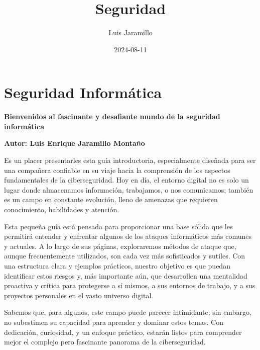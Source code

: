 \documentclass[
  letterpaper,
  DIV=11,
  numbers=noendperiod]{scrreprt}
\title{Seguridad}
\author{Luis Jaramillo}
\date{2024-08-11}
\renewcommand*\contentsname{Table of contents}
\newcommand\contentsname{Table of contents}
\begin{document}
\maketitle
\ifdefined\Shaded\renewenvironment{Shaded}{\begin{tcolorbox}[sharp corners, boxrule=0pt, enhanced, breakable, borderline west={3pt}{0pt}{shadecolor}, interior hidden, frame hidden]}{\end{tcolorbox}}\fi

\renewcommand*\contentsname{Table of contents}
{
\hypersetup{linkcolor=}
\setcounter{tocdepth}{2}
\tableofcontents
}

\hypertarget{seguridad-informuxe1tica}{%
\chapter{Seguridad Informática}\label{seguridad-informuxe1tica}}

\textbf{Bienvenidos al fascinante y desafiante mundo de la seguridad
informática}

\textbf{Autor: Luis Enrique Jaramillo Montaño}

Es un placer presentarles esta guía introductoria, especialmente
diseñada para ser una compañera confiable en su viaje hacia la
comprensión de los aspectos fundamentales de la ciberseguridad. Hoy en
día, el entorno digital no es solo un lugar donde almacenamos
información, trabajamos, o nos comunicamos; también es un campo en
constante evolución, lleno de amenazas que requieren conocimiento,
habilidades y atención.

Esta pequeña guía está pensada para proporcionar una base sólida que les
permitirá entender y enfrentar algunos de los ataques informáticos más
comunes y actuales. A lo largo de sus páginas, exploraremos métodos de
ataque que, aunque frecuentemente utilizados, son cada vez más
sofisticados y sutiles. Con una estructura clara y ejemplos prácticos,
nuestro objetivo es que puedan identificar estos riesgos y, más
importante aún, que desarrollen una mentalidad proactiva y crítica para
protegerse a sí mismos, a sus entornos de trabajo, y a sus proyectos
personales en el vasto universo digital.

Sabemos que, para algunos, este campo puede parecer intimidante; sin
embargo, no subestimen su capacidad para aprender y dominar estos temas.
Con dedicación, curiosidad, y un enfoque práctico, estarán listos para
comprender mejor el complejo pero fascinante panorama de la
ciberseguridad.
\end{document}
